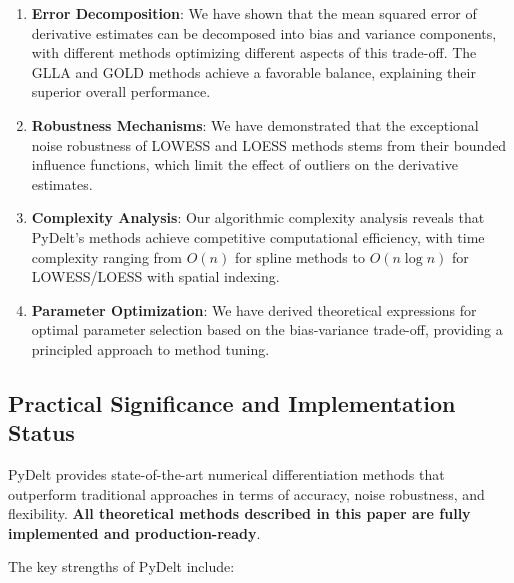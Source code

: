 \documentclass[10pt,journal,compsoc]{IEEEtran}
\begin{document}
\begin{enumerate}
    \item \textbf{Error Decomposition}: We have shown that the mean squared error of derivative estimates can be decomposed into bias and variance components, with different methods optimizing different aspects of this trade-off. The GLLA and GOLD methods achieve a favorable balance, explaining their superior overall performance.
    
    \item \textbf{Robustness Mechanisms}: We have demonstrated that the exceptional noise robustness of LOWESS and LOESS methods stems from their bounded influence functions, which limit the effect of outliers on the derivative estimates.
    
    \item \textbf{Complexity Analysis}: Our algorithmic complexity analysis reveals that PyDelt's methods achieve competitive computational efficiency, with time complexity ranging from $O(n)$ for spline methods to $O(n \log n)$ for LOWESS/LOESS with spatial indexing.
    
    \item \textbf{Parameter Optimization}: We have derived theoretical expressions for optimal parameter selection based on the bias-variance trade-off, providing a principled approach to method tuning.
\end{enumerate}

\subsection{Practical Significance and Implementation Status}

PyDelt provides state-of-the-art numerical differentiation methods that outperform traditional approaches in terms of accuracy, noise robustness, and flexibility. \textbf{All theoretical methods described in this paper are fully implemented and production-ready}.

The key strengths of PyDelt include:
\end{document}
